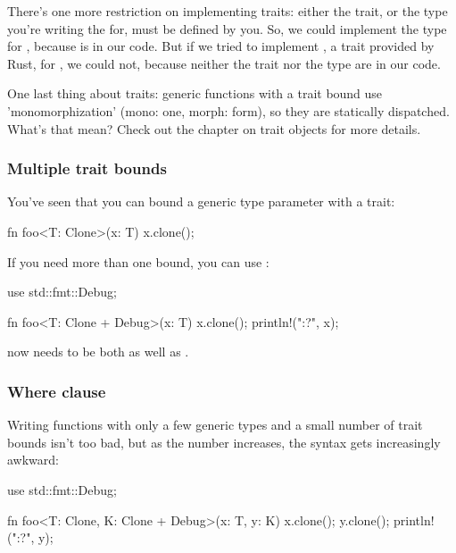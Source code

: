 \blank

There's one more restriction on implementing traits: either the trait, or the type you're writing the  for, must be defined 
by you. So, we could implement the  type for \itt, because  is in our code. But if we tried to implement 
, a trait provided by Rust, for \itt, we could not, because neither the trait nor the type are in our code.

\blank

One last thing about traits: generic functions with a trait bound use 'monomorphization' (mono: one, morph: form), so they are 
statically dispatched. What's that mean? Check out the chapter on trait objects for more details.

\subsubsection*{Multiple trait bounds}

You've seen that you can bound a generic type parameter with a trait:

\begin{rustc}
fn foo<T: Clone>(x: T) {
    x.clone();
}
\end{rustc}

If you need more than one bound, you can use \code{+}:

\begin{rustc}
use std::fmt::Debug;

fn foo<T: Clone + Debug>(x: T) {
    x.clone();
    println!("{:?}", x);
}
\end{rustc}

 now needs to be both  as well as .

\subsubsection*{Where clause}

Writing functions with only a few generic types and a small number of trait bounds isn't too bad, but as the number increases, the 
syntax gets increasingly awkward:

\begin{rustc}
use std::fmt::Debug;

fn foo<T: Clone, K: Clone + Debug>(x: T, y: K) {
    x.clone();
    y.clone();
    println!("{:?}", y);
}
\end{rustc}

